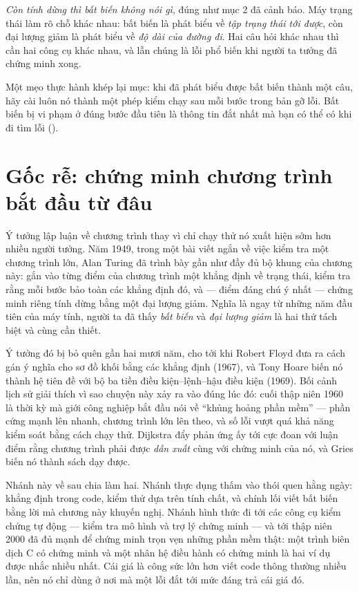 \documentclass[../../algorithm.tex]{subfiles}
\begin{document}
\emph{Còn tính dừng thì bất biến không nói gì}, đúng như mục 2 đã cảnh báo. Máy trạng thái làm rõ chỗ khác nhau: bất biến là phát biểu về \emph{tập trạng thái tới được}, còn đại lượng giảm là phát biểu về \emph{độ dài của đường đi}. Hai câu hỏi khác nhau thì cần hai công cụ khác nhau, và lẫn chúng là lỗi phổ biến khi người ta tưởng đã chứng minh xong.

Một mẹo thực hành khép lại mục: khi đã phát biểu được bất biến thành một câu, hãy cài luôn nó thành một phép kiểm  chạy sau mỗi bước trong bản gỡ lỗi. Bất biến bị vi phạm ở đúng bước đầu tiên là thông tin đắt nhất mà bạn có thể có khi đi tìm lỗi ().

\section{Gốc rễ: chứng minh chương trình bắt đầu từ đâu}

Ý tưởng lập luận về chương trình thay vì chỉ chạy thử nó xuất hiện sớm hơn nhiều người tưởng. Năm 1949, trong một bài viết ngắn về việc kiểm tra một chương trình lớn, Alan Turing đã trình bày gần như đầy đủ bộ khung của chương này: gắn vào từng điểm của chương trình một khẳng định về trạng thái, kiểm tra rằng mỗi bước bảo toàn các khẳng định đó, và --- điểm đáng chú ý nhất --- chứng minh riêng tính dừng bằng một đại lượng giảm. Nghĩa là ngay từ những năm đầu tiên của máy tính, người ta đã thấy \emph{bất biến} và \emph{đại lượng giảm} là hai thứ tách biệt và cùng cần thiết.

Ý tưởng đó bị bỏ quên gần hai mươi năm, cho tới khi Robert Floyd đưa ra cách gán ý nghĩa cho sơ đồ khối bằng các khẳng định (1967), và Tony Hoare biến nó thành hệ tiên đề với bộ ba tiền điều kiện--lệnh--hậu điều kiện (1969)\cite{hoare1969}. Bối cảnh lịch sử giải thích vì sao chuyện này xảy ra vào đúng lúc đó: cuối thập niên 1960 là thời kỳ mà giới công nghiệp bắt đầu nói về ``khủng hoảng phần mềm'' --- phần cứng mạnh lên nhanh, chương trình lớn lên theo, và số lỗi vượt quá khả năng kiểm soát bằng cách chạy thử. Dijkstra đẩy phản ứng ấy tới cực đoan với luận điểm rằng chương trình phải được \emph{dẫn xuất} cùng với chứng minh của nó\cite{dijkstra1976}, và Gries biến nó thành sách dạy được\cite{gries1981}.

Nhánh này về sau chia làm hai. Nhánh thực dụng thấm vào thói quen hằng ngày: khẳng định trong code, kiểm thử dựa trên tính chất, và chính lối viết bất biến bằng lời mà chương này khuyến nghị. Nhánh hình thức đi tới các công cụ kiểm chứng tự động --- kiểm tra mô hình và trợ lý chứng minh --- và tới thập niên 2000 đã đủ mạnh để chứng minh trọn vẹn những phần mềm thật: một trình biên dịch C có chứng minh và một nhân hệ điều hành có chứng minh là hai ví dụ được nhắc nhiều nhất. Cái giá là công sức lớn hơn viết code thông thường nhiều lần, nên nó chỉ dùng ở nơi mà một lỗi đắt tới mức đáng trả cái giá đó.
\end{document}
